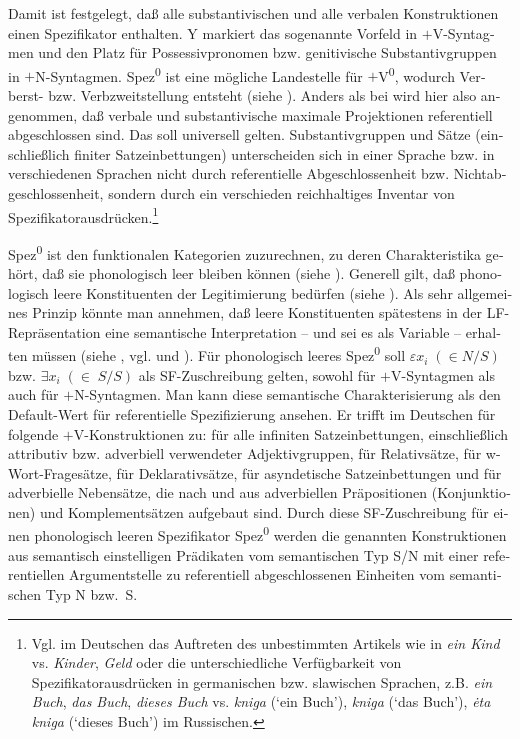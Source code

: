 \documentclass[output=paper,colorlinks,citecolor=brown, booklanguage=german]{langscibook}
\begin{document}
\begin{otherlanguage}{german}
\noindent Damit ist festgelegt, daß alle substantivischen und alle verbalen Konstruktionen einen Spezifikator enthalten. Y markiert das sogenannte Vorfeld in $+$V-Syn\-tag\-men und den Platz für Possessivpronomen bzw. genitivische Substantivgruppen in $+$N-Syntagmen. Spez\textsuperscript{0} ist eine mögliche Landestelle für $+$V\textsuperscript{0}, wodurch Verberst- bzw. Verbzweitstellung entsteht (siehe \citealt{Haider1986b,Haider1986a}). Anders als bei \citet{Fukui1986} wird hier also angenommen, daß verbale und substantivische maximale Projektionen referentiell abgeschlossen sind. Das soll universell gelten. Substantivgruppen und Sätze (einschließlich finiter Satzeinbettungen) unterscheiden sich in einer Sprache bzw. in verschiedenen Sprachen nicht durch referentielle Abgeschlossenheit bzw. Nichtabgeschlossenheit, sondern durch ein verschieden reichhaltiges Inventar von Spezifikatorausdrücken.\footnote{Vgl. im Deutschen das Auftreten des unbestimmten Artikels wie in \textit{ein Kind} vs. \textit{Kinder}, \textit{Geld} oder die unterschiedliche Verfügbarkeit von Spezifikatorausdrücken in germanischen bzw. slawischen Sprachen, z.B. \textit{ein Buch}, \textit{das Buch}, \textit{dieses Buch} vs. \textit{kniga} (‘ein Buch’), \textit{kniga} (‘das Buch’), \textit{ėta kniga} (‘dieses Buch’) im Rus\-si\-schen.}

Spez\textsuperscript{0} ist den funktionalen Kategorien zuzurechnen, zu deren Charakteristika gehört, daß sie phonologisch leer bleiben können (siehe \citealt{Emonds1985,Emonds1987}). Generell gilt, daß phonologisch leere Konstituenten der Legitimierung bedürfen (siehe \citealt{Chomsky1981,Chomsky1982,Chomsky1986}). Als sehr allgemeines Prinzip könnte man annehmen, daß leere Konstituenten spätestens in der LF-Repräsentation eine semantische Interpretation -- und sei es als Variable -- erhalten müssen (siehe \citealt{Schwabe1987}, vgl. \citealt{Bierwisch1987a} und \citealt{Zimmermann1987a}). Für phonologisch leeres Spez\textsuperscript{0} soll $\varepsilon x_i \; (\in N/S)$ bzw. $\exists x_i  \; (\in \; S/S)$ 
als SF-Zuschreibung gelten, sowohl für $+$V-Syn\-tag\-men als auch für $+$N-Syntagmen. Man kann diese semantische Charakterisierung als den Default-Wert für referentielle Spezifizierung ansehen. Er trifft im Deutschen für folgende $+$V-Konstruktionen zu: für alle infiniten Satzeinbettungen, ein\-schließ\-lich attributiv bzw. adverbiell verwendeter Adjektivgruppen, für Relativsätze, für w-Wort-Fragesätze, für Deklarativsätze, für asyndetische Satzeinbettungen und für adverbielle Nebensätze, die nach \citet{Jackendoff1974,Jackendoff1977} und \citet{Steube1987-druck,Steube1987} aus adverbiellen Präpositionen (Konjunktionen) und Komplementsätzen aufgebaut sind. Durch diese SF-Zuschreibung für einen phonologisch leeren Spezifikator Spez\textsuperscript{0} werden die genannten Konstruktionen aus semantisch einstelligen Prädikaten vom semantischen Typ S/N mit einer re\-fe\-ren\-tiel\-len Argumentstelle zu referentiell abgeschlossenen Einheiten vom se\-man\-ti\-schen Typ N bzw.~S.


\end{otherlanguage}
\end{document}
